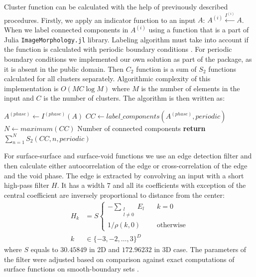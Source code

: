 \documentclass[1p]{elsarticle}
\newcommand{\code}[1]{\colorbox{light-gray}{\texttt{#1}}}
\begin{document}
Cluster function can be calculated with the help of previuously described
procedures.  Firstly, we apply an indicator function to an input $A$:
$A^{(i)} \xleftarrow{I^{(i)}} A$. When we label connected components in
$A^{(i)}$ using a function that is a part of Julia \code{ImageMorphology.jl}
library.  Labeling algorithm must take into account if the function is
calculated with periodic boundary conditions \cite{evstigneev2023}. For periodic
boundary conditions we implemented our own solution as part of the package, as
it is absent in the public domain. Then $C_2$ function is a sum of $S_2$
functions calculated for all clusters separately. Algorithmic complexity of this
implementation is $O(MC\log M)$ where $M$ is the number of elements in the input
and $C$ is the number of clusters. The algorithm is then written as:
\begin{algorithmic}[1]
  \State $A^{(phase)} \gets I^{(phase)} (A)$
  \State $CC \gets label\_components(A^{(phase)}, periodic)$
  \State $N \gets maximum(CC)$ \Comment Number of connected components
  \State \textbf{return} $\sum\limits_{n=1}^N S_2(CC, n, periodic)$
  \EndProcedure
\end{algorithmic}

For surface-surface and surface-void functions we use an edge detection filter
\cite{samarin2023robust} and then calculate either autocorrelation of the edge
or cross-correlation of the edge and the void phase. The edge is extracted by
convolving an input with a short high-pass filter $H$. It has a width $7$ and
all its coefficients with exception of the central coefficient are inversely
proportional to distance from the center:
\begin{equation}
  \begin{aligned}
    H_k &= S \left\{
    \begin{array}{ll}
      -\sum\limits_{\substack{l \\ l \ne 0}} E_l & \quad k = 0 \\
      1 / \rho(k, 0) & \quad \text{otherwise}
    \end{array}
    \right. \\
    k &\in \{-3, -2, \dots, 3\}^D
  \end{aligned}
  \label{eq:filter-7x7}
\end{equation}
where $S$ equals to $30.45849$ in 2D and $172.96232$ in 3D case. The parameters
of the filter were adjusted based on comparison against exact computations of
surface functions on smooth-boundary sets \cite{postcov23}.
\end{document}
